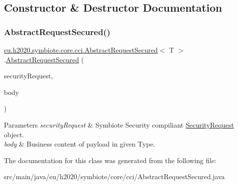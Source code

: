 \subsection{Constructor \& Destructor Documentation}
\mbox{\label{classeu_1_1h2020_1_1symbiote_1_1core_1_1cci_1_1AbstractRequestSecured_a237493fdc92b6ed01f32ae8b2a7089ad}} 
\subsubsection{\texorpdfstring{Abstract\+Request\+Secured()}{AbstractRequestSecured()}}
{\footnotesize\ttfamily \hyperlink{classeu_1_1h2020_1_1symbiote_1_1core_1_1cci_1_1AbstractRequestSecured}{eu.\+h2020.\+symbiote.\+core.\+cci.\+Abstract\+Request\+Secured}$<$ T $>$.\hyperlink{classeu_1_1h2020_1_1symbiote_1_1core_1_1cci_1_1AbstractRequestSecured}{Abstract\+Request\+Secured} (\begin{DoxyParamCaption}\item[{Security\+Request}]{security\+Request,  }\item[{T}]{body }\end{DoxyParamCaption})}


\begin{DoxyParams}{Parameters}
{\em security\+Request} & Symbiote Security compiliant \hyperlink{}{Security\+Request} object. \\
\hline
{\em body} & Business content of payload in given Type. \\
\hline
\end{DoxyParams}


The documentation for this class was generated from the following file\+:\begin{DoxyCompactItemize}
\item 
src/main/java/eu/h2020/symbiote/core/cci/Abstract\+Request\+Secured.\+java\end{DoxyCompactItemize}
